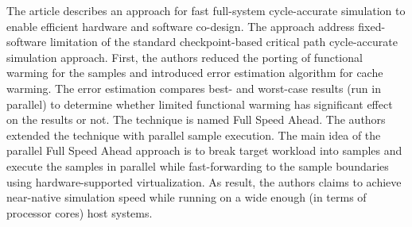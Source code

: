 \begin{itemize}
    The article describes an approach for fast full-system cycle-accurate simulation to enable efficient hardware and software co-design. The approach address fixed-software limitation of the standard checkpoint-based critical path cycle-accurate simulation approach. First, the authors reduced the porting of functional warming for the samples and introduced error estimation algorithm for cache warming. The error estimation compares best- and worst-case results (run in parallel) to determine whether limited functional warming has significant effect on the results or not. The technique is named Full Speed Ahead. The authors extended the technique with parallel sample execution. The main idea of the parallel Full Speed Ahead approach is to break target workload into samples and execute the samples in parallel while fast-forwarding to the sample boundaries using hardware-supported virtualization. As result, the authors claims to achieve near-native simulation speed while running on a wide enough (in terms of processor cores) host systems.
\end{itemize}


